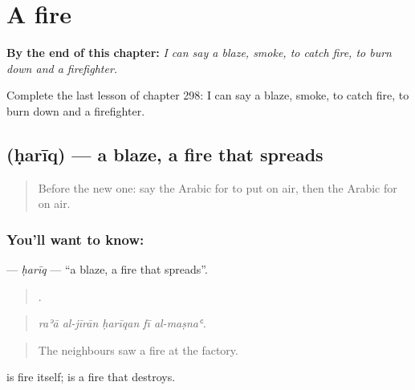 
\chapter{A fire}
\label{ch:ar-a-fire}

\begin{chapteropening}
\textbf{By the end of this chapter:} \emph{I can say a blaze, smoke, to catch fire, to burn down and a firefighter.}

Complete the last lesson of chapter 298: I can say a blaze, smoke, to catch fire, to burn down and a firefighter.
\end{chapteropening}

\section[\texorpdfstring{\ar{حريق} (ḥarīq)}{حريق (ḥarīq)}]{ (ḥarīq) — a blaze, a fire that spreads}

\label{lesson:AR-C298-hariq}



\begin{quote}
Before the new one: say the Arabic for to put on air, then the Arabic for on air.
\end{quote}

\subsection*{You'll want to know: }
\textbf{} — \emph{ḥarīq} — \textquotedblleft{}a blaze, a fire that spreads\textquotedblright{}.

\begin{quote}
    .
\end{quote}

\begin{quote}
\emph{raʾā al-jīrān ḥarīqan fī al-maṣnaʿ.}
\end{quote}

\begin{quote}
The neighbours saw a fire at the factory.
\end{quote}

 is fire itself;  is a fire that destroys.

